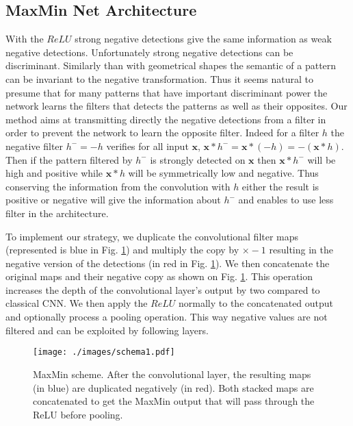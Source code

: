 \documentclass{article}
\def\x{{\mathbf x}}
\begin{document}
\subsection{MaxMin Net Architecture}
\label{ssec:subhead}
With the $ReLU$ strong negative detections give the same information as weak negative detections. Unfortunately strong negative detections can be discriminant. 
Similarly than with geometrical shapes the semantic of a pattern can be invariant to the negative transformation. %
Thus it seems natural to presume that for many patterns that have important discriminant power the network learns the filters that detects the patterns as well as their opposites. %
Our method aims at transmitting directly the negative detections from a filter in order to prevent the network to learn the opposite filter. Indeed for a filter $h$ the negative filter $h^{-}=-h$ verifies for all input $\x$, $\x*h^{-} = \x *(-h) = - (\x*h)$. Then if the pattern filtered by $h^{-}$ is strongly detected on $\x$ then $\x*h^{-}$ will be high and positive while $\x*h$ will be symmetrically low and negative. Thus conserving the information from the convolution with $h$ either the result is positive or negative will give the information about $h^{-}$ and enables to use less filter in the architecture.

To implement our strategy, we duplicate the convolutional filter maps (represented is blue in Fig. \ref{scheme1}) and multiply the copy by $\times -1$ resulting in the negative version of the detections (in red in Fig. \ref{scheme1}). 
We then concatenate the original maps and their negative copy as shown on Fig. \ref{scheme1}. This operation increases the depth of the convolutional layer's output by two compared to classical CNN. We then apply the $ReLU$ normally to the concatenated output and optionally process a pooling operation. This way negative values are not filtered and can be exploited by following layers.

\begin{figure}[htb]
\centering
   \texttt{[image: ./images/schema1.pdf]}
\caption{MaxMin scheme. After the convolutional layer, the resulting maps (in blue) are duplicated negatively (in red). Both stacked maps are concatenated to get the MaxMin output that will pass through the ReLU before pooling.}
\label{scheme1}
\end{figure}
\end{document}
